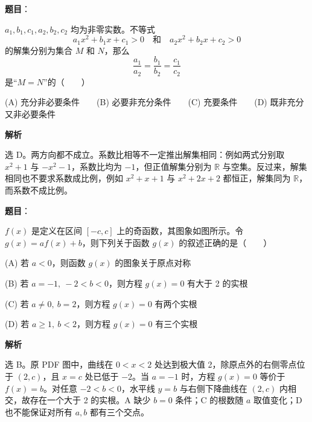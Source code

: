\begin{answer}

\textbf{题目}：

\(a_1,b_1,c_1,a_2,b_2,c_2\) 均为非零实数。不等式
\nopagebreak[4]
\[
    a_1x^2+b_1x+c_1>0\quad\text{和}\quad a_2x^2+b_2x+c_2>0
\]
    的解集分别为集合 \(M\) 和 \(N\)，那么
\nopagebreak[4]
\[
    \frac{a_1}{a_2}=\frac{b_1}{b_2}=\frac{c_1}{c_2}
\]
    是“\(M=N\)”的\mbox{（　　）}

    (A) 充分非必要条件　　(B) 必要非充分条件　　(C) 充要条件　　(D) 既非充分又非必要条件

\textbf{解析}

选 D。两方向都不成立。系数比相等不一定推出解集相同：例如两式分别取 \(x^2+1\) 与 \(-x^2-1\)，系数比均为 \(-1\)，但正值解集分别为 \(\mathbb R\) 与空集。反过来，解集相同也不要求系数成比例，例如 \(x^2+x+1\) 与 \(x^2+2x+2\) 都恒正，解集同为 \(\mathbb R\)，而系数不成比例。


\end{answer}
\begin{answer}

\textbf{题目}：

\(f(x)\) 是定义在区间 \([-c,c]\) 上的奇函数，其图象如图所示。令 \(g(x)=af(x)+b\)，则下列关于函数 \(g(x)\) 的叙述正确的是\mbox{（　　）}

    (A) 若 \(a<0\)，则函数 \(g(x)\) 的图象关于原点对称

    (B) 若 \(a=-1,\ -2<b<0\)，则方程 \(g(x)=0\) 有大于 2 的实根

    (C) 若 \(a\ne0,\ b=2\)，则方程 \(g(x)=0\) 有两个实根

    (D) 若 \(a\ge1,\ b<2\)，则方程 \(g(x)=0\) 有三个实根
\nopagebreak[4]
\begin{center}\end{center}
\nopagebreak[4]
\textbf{解析}

选 B。原 PDF 图中，曲线在 \(0<x<2\) 处达到极大值 2，除原点外的右侧零点位于 \((2,c)\)，且 \(x=c\) 处已低于 \(-2\)。当 \(a=-1\) 时，方程 \(g(x)=0\) 等价于 \(f(x)=b\)。对任意 \(-2<b<0\)，水平线 \(y=b\) 与右侧下降曲线在 \((2,c)\) 内相交，故存在一个大于 2 的实根。A 缺少 \(b=0\) 条件；C 的根数随 \(a\) 取值变化；D 也不能保证对所有 \(a,b\) 都有三个交点。


\end{answer}

